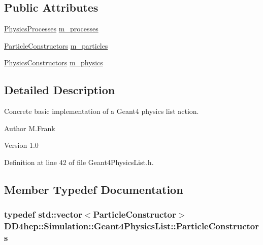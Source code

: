 \subsection*{Public Attributes}
\begin{DoxyCompactItemize}
\item 
\hyperlink{class_d_d4hep_1_1_simulation_1_1_geant4_physics_list_ab41e55687c9d57878fe2e6847a31f19a}{PhysicsProcesses} \hyperlink{class_d_d4hep_1_1_simulation_1_1_geant4_physics_list_af3a8295fc76fdab16b92a9cff9b07b56}{m\_\-processes}
\item 
\hyperlink{class_d_d4hep_1_1_simulation_1_1_geant4_physics_list_afaee3763aea79b299830be37f9642342}{ParticleConstructors} \hyperlink{class_d_d4hep_1_1_simulation_1_1_geant4_physics_list_afb427bf428aa0c62f79717a598f60de7}{m\_\-particles}
\item 
\hyperlink{class_d_d4hep_1_1_simulation_1_1_geant4_physics_list_a5953826b626c21fa4b26ab9a07f3b8ad}{PhysicsConstructors} \hyperlink{class_d_d4hep_1_1_simulation_1_1_geant4_physics_list_a7b5de6ccab6cd1083de316546cdba96e}{m\_\-physics}
\end{DoxyCompactItemize}


\subsection{Detailed Description}
Concrete basic implementation of a Geant4 physics list action. \begin{DoxyAuthor}{Author}
M.Frank 
\end{DoxyAuthor}
\begin{DoxyVersion}{Version}
1.0 
\end{DoxyVersion}


Definition at line 42 of file Geant4PhysicsList.h.

\subsection{Member Typedef Documentation}
\hypertarget{class_d_d4hep_1_1_simulation_1_1_geant4_physics_list_afaee3763aea79b299830be37f9642342}{
\subsubsection[{ParticleConstructors}]{\setlength{\rightskip}{0pt plus 5cm}typedef std::vector$<${\bf ParticleConstructor}$>$ {\bf DD4hep::Simulation::Geant4PhysicsList::ParticleConstructors}}}
\label{class_d_d4hep_1_1_simulation_1_1_geant4_physics_list_afaee3763aea79b299830be37f9642342}


